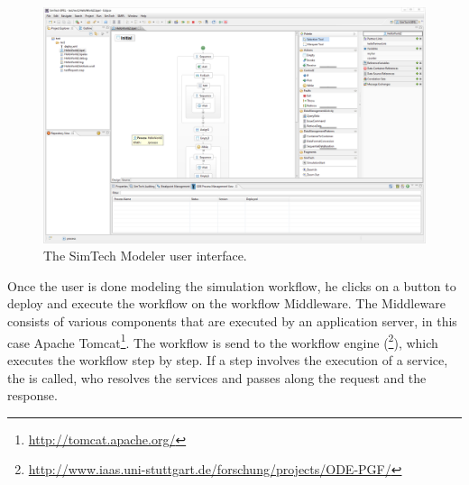 \begin{figure}[!htbp]
	\centering
	\includegraphics[width=\textwidth,interpolate=false]{fundamentals/assets/simtech_modeler}
	\caption{The SimTech Modeler user interface.}
	\label{image:modeler}
\end{figure}

Once the user is done modeling the simulation workflow, he clicks on a button to deploy and execute the workflow on the workflow Middleware.
The Middleware consists of various components that are executed by an application server, in this case Apache Tomcat\footnote{\url{http://tomcat.apache.org/}}.
The workflow is send to the workflow engine (\footnote{\url{http://www.iaas.uni-stuttgart.de/forschung/projects/ODE-PGF/}}), which executes the workflow step by step.
If a step involves the execution of a service, the  is called, who resolves the services and passes along the request and the response.
